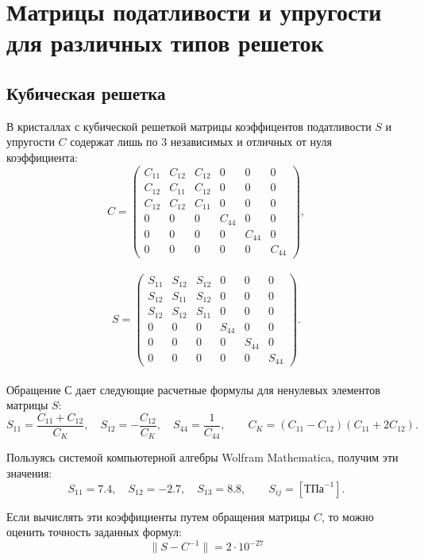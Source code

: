 \documentclass[12pt,a4paper]{article}
\begin{document}
\newpage

\section{Матрицы податливости и упругости для различных типов решеток}

\subsection{Кубическая решетка}

В кристаллах с кубической решеткой матрицы коэффицентов податливости $S$ и упругости $C$ содержат лишь по $3$ независимых и отличных от нуля коэффициента:
\[
    C=
    \begin{pmatrix}
    C_{11} & C_{12} & C_{12} & 0 & 0 & 0\\
    C_{12} & C_{11} & C_{12} & 0 & 0 & 0\\
    C_{12} & C_{12} & C_{11} & 0 & 0 & 0\\
    0 & 0 & 0 & C_{44} & 0 & 0\\
    0 & 0 & 0 & 0 & C_{44} & 0\\
    0 & 0 & 0 & 0 & 0 & C_{44} 
    \end{pmatrix},  
\]
\\
\[
    S=
    \begin{pmatrix}
    S_{11} & S_{12} & S_{12} & 0 & 0 & 0\\
    S_{12} & S_{11} & S_{12} & 0 & 0 & 0\\
    S_{12} & S_{12} & S_{11} & 0 & 0 & 0\\
    0 & 0 & 0 & S_{44} & 0 & 0\\
    0 & 0 & 0 & 0 & S_{44} & 0\\
    0 & 0 & 0 & 0 & 0 & S_{44} 
    \end{pmatrix}.  
\]
\\
Обращение $С$ дает следующие расчетные формулы для ненулевых элементов матрицы $S\colon$
\[
    S_{11}=\frac{C_{11}+C_{12}}{C_K}, \quad S_{12}=-\frac{C_{12}}{C_K}, \quad S_{44}=\frac{1}{C_{44}}, \qquad C_K=(C_{11}-C_{12})(C_{11}+2C_{12}).  
\]

Пользуясь системой компьютерной алгебры Wolfram Mathematica, получим эти значения:
\[
    S_{11} = 7.4, \quad S_{12} = -2.7, \quad S_{13} = 8.8, \qquad S_{ij} = [\text{ТПа}^{-1}].
\]

Если вычислять эти коэффициенты путем обращения матрицы $C$, то можно оценить точность заданных формул:
\[
  \| S - C^{-1} \|  = 2 \cdot 10^{-27}
\]
\end{document}
